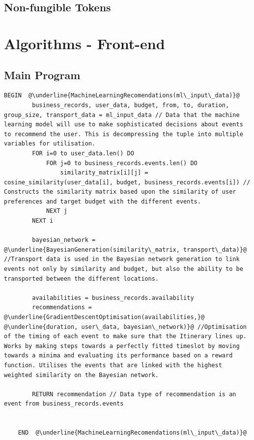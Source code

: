 \subsection{Non-fungible Tokens}

\section{Algorithms - Front-end}

\subsection{Main Program}

\begin{lstlisting}[caption=Machine Learning Recommendations and Optimisation, escapechar=\@]
	BEGIN  @\underline{MachineLearningRecomendations(ml\_input\_data)}@
		business_records, user_data, budget, from, to, duration, group_size, transport_data = ml_input_data // Data that the machine learning model will use to make sophisticated decisions about events to recommend the user. This is decompressing the tuple into multiple variables for utilisation.
		FOR i=0 to user_data.len() DO
			FOR j=0 to business_records.events.len() DO
				similarity_matrix[i][j] = cosine_similarity(user_data[i], budget, business_records.events[i]) // Constructs the similarity matrix based upon the similarity of user preferences and target budget with the different events.
			NEXT j
		NEXT i

		bayesian_network = @\underline{BayesianGeneration(similarity\_matrix, transport\_data)}@ //Transport data is used in the Bayesian network generation to link events not only by similarity and budget, but also the ability to be transported between the different locations.

		availabilities = business_records.availability
		recommendations = @\underline{GradientDescentOptimisation(availabilities,}@ @\underline{duration, user\_data, bayesian\_network)}@ //Optimisation of the timing of each event to make sure that the Itinerary lines up. Works by making steps towards a perfectly fitted timeslot by moving towards a minima and evaluating its performance based on a reward function. Utilises the events that are linked with the highest weighted similarity on the Bayesian network. 

		RETURN recommendation // Data type of recommendation is an event from business_records.events
		

	END  @\underline{MachineLearningRecomendations(ml\_input\_data)}@
			
\end{lstlisting}
